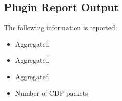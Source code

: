\documentclass[documentation]{subfiles}
\begin{document}
\subsection{Plugin Report Output}
The following information is reported:
\begin{itemize}
    \item Aggregated {\tt{}}
    \item Aggregated {\tt{}}
    \item Aggregated {\tt{}}
    \item Number of CDP packets
\end{itemize}
\end{document}
